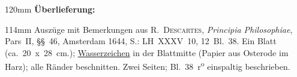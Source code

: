\begin{ledgroupsized}[r]{120mm}
\footnotesize
\pstart
\noindent\textbf{Überlieferung:}
\pend
\end{ledgroupsized}
\begin{ledgroupsized}[r]{114mm}
\footnotesize
\pstart \parindent -6mm
%
Auszüge mit Bemerkungen aus 
\textsc{R.~Descartes},
\cite{00035}\textit{Principia Philosophiae}, Pars~II, §§~46, Amsterdam 1644, S.:
LH~XXXV~10, 12~Bl.~38.
Ein Blatt (ca.~20~x~28~cm.);
\href{\Scan{LH_35_10_12_038wz}}%
{Wasserzeichen}
in der Blattmitte (Papier aus Osterode im Harz); %
alle Ränder beschnitten.
Zwei Seiten;
Bl.~38~r\textsuperscript{o} einspaltig beschrieben.
\pend
\end{ledgroupsized}
\vspace{5mm}
